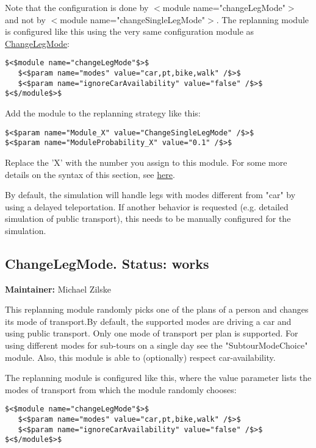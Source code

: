 \documentclass[a4paper,11pt]{report}
\begin{document}
Note that the configuration is done by $<$module  name="changeLegMode"$>$ and not by $<$module  name="changeSingleLegMode"$>$. The replanning module is configured like  this using the very same configuration module as \href{http://www.matsim.org/node/387}{ChangeLegMode}:
\begin{verbatim}
$<$module name="changeLegMode"$>$
   $<$param name="modes" value="car,pt,bike,walk" /$>$
   $<$param name="ignoreCarAvailability" value="false" /$>$
$<$/module$>$
\end{verbatim}

Add the module to the replanning strategy like this:
\begin{verbatim}
$<$param name="Module_X" value="ChangeSingleLegMode" /$>$
$<$param name="ModuleProbability_X" value="0.1" /$>$
\end{verbatim}

Replace the 'X' with the number you assign to this module. For some more details on the syntax of this section, see \href{http://matsim.org/node/478}{here}.


By default, the simulation will handle legs with modes different from  "car" by using a delayed teleportation. If another behavior is  requested (e.g. detailed simulation of public transport), this needs to  be manually configured for the simulation.


\subsection{ChangeLegMode. Status: works}


\textbf{Maintainer:} Michael Zilske

This replanning module randomly picks one of the plans of a person  and changes its mode of transport.By default, the supported modes  are driving a car and using public transport. Only one mode of transport  per plan is supported. For using different modes for sub-tours on a  single day see the "SubtourModeChoice" module. Also, this module is able  to (optionally) respect car-availability.

The replanning module is configured like this, where the value  parameter lists the modes of transport from which the module randomly  chooses:
\begin{verbatim}
$<$module name="changeLegMode"$>$
   $<$param name="modes" value="car,pt,bike,walk" /$>$
   $<$param name="ignoreCarAvailability" value="false" /$>$
$<$/module$>$
\end{verbatim}
\end{document}
